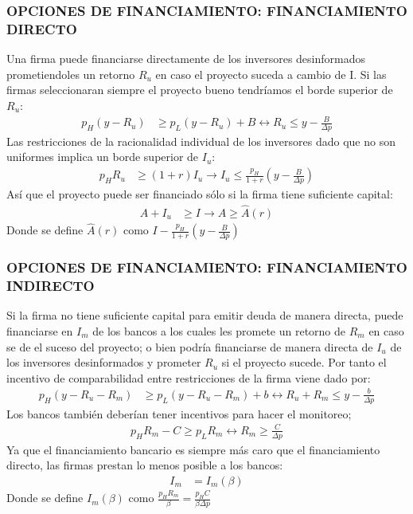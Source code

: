 \begin{frame}
    \frametitle{{\normalsize OPCIONES DE FINANCIAMIENTO: FINANCIAMIENTO DIRECTO} {}}

 Una firma puede financiarse directamente de los inversores desinformados prometiendoles un retorno $R_{u}$ en caso el proyecto suceda  a cambio de I. Si las firmas seleccionaran siempre el proyecto bueno tendríamos el borde superior de $R_{u}$:
 \begin{align}
 p_{H}(y-R_{u})&\geq p_{L}(y-R_{u})+B\leftrightarrow R_{u}\leq y-\frac{B}{\Delta p}
 \end{align}
 Las restricciones de la racionalidad individual de los inversores dado que no son uniformes implica un borde superior de $I_{u}$:
 \begin{align}
 p_{H}R_{u}&\geq (1+r)I_{u}\rightarrow I_{u}\leq \frac{p_{H}}{1+r}(y-\frac{B}{\Delta p})
 \end{align}
 Así que el proyecto puede ser financiado sólo si la firma tiene suficiente capital:
 \begin{align}
 A+I_{u}&\geq I \rightarrow A \geq \hat{A}(r) 
 \end{align}
 Donde se define $\hat{A}(r)$ como $I-\frac{p_{H}}{1+r}(y-\frac{B}{\Delta p})$
 
 \end{frame}


\begin{frame}
    \frametitle{{\normalsize OPCIONES DE FINANCIAMIENTO: FINANCIAMIENTO INDIRECTO} {}}
    
   Si la firma no tiene suficiente capital para emitir deuda de manera directa, puede financiarse en $I_{m}$ de los bancos a los cuales les promete un retorno de $R_{m}$ en caso se de el suceso del proyecto; o bien podría financiarse de manera directa de $I_{u}$ de los inversores desinformados y prometer $R_{u}$ si el proyecto sucede. Por tanto el incentivo de comparabilidad entre restricciones de la firma viene dado por:
    \begin{align}
   p_{H}(y-R_{u}-R_{m})&\geq p_{L}(y-R_{u}-R_{m})+b\leftrightarrow R_{u}+R_{m}\leq y-\frac{b}{\Delta p} 
    \end{align}
    Los bancos también deberían tener incentivos para hacer el monitoreo;
     \begin{align}
    p_{H}R_{m}-C\geq p_{L}R_{m}\leftrightarrow R_{m}\geq \frac{C}{\Delta p}
    \end{align}
    Ya que el financiamiento bancario es siempre más caro que el financiamiento directo, las firmas prestan lo menos posible a los bancos:
     \begin{align}
    I_{m}&=I_{m}(\beta)
    \end{align}
    Donde se define $I_{m}(\beta)$ como $\frac{p_{H}R_{m}}{\beta}= \frac{p_{H}C}{\beta \Delta p}$
    
\end{frame}

